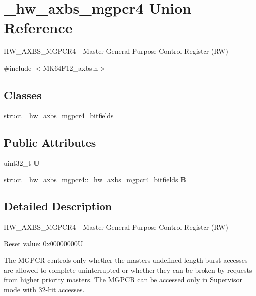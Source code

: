 \hypertarget{union__hw__axbs__mgpcr4}{}\section{\+\_\+hw\+\_\+axbs\+\_\+mgpcr4 Union Reference}
\label{union__hw__axbs__mgpcr4}


H\+W\+\_\+\+A\+X\+B\+S\+\_\+\+M\+G\+P\+C\+R4 -\/ Master General Purpose Control Register (RW)  




{\ttfamily \#include $<$M\+K64\+F12\+\_\+axbs.\+h$>$}

\subsection*{Classes}
\begin{DoxyCompactItemize}
\item 
struct \hyperlink{struct__hw__axbs__mgpcr4_1_1__hw__axbs__mgpcr4__bitfields}{\+\_\+hw\+\_\+axbs\+\_\+mgpcr4\+\_\+bitfields}
\end{DoxyCompactItemize}
\subsection*{Public Attributes}
\begin{DoxyCompactItemize}
\item 
uint32\+\_\+t {\bfseries U}\hypertarget{union__hw__axbs__mgpcr4_a91cc8c8ae195b426b1f2929d1d1484ff}{}\label{union__hw__axbs__mgpcr4_a91cc8c8ae195b426b1f2929d1d1484ff}

\item 
struct \hyperlink{struct__hw__axbs__mgpcr4_1_1__hw__axbs__mgpcr4__bitfields}{\+\_\+hw\+\_\+axbs\+\_\+mgpcr4\+::\+\_\+hw\+\_\+axbs\+\_\+mgpcr4\+\_\+bitfields} {\bfseries B}\hypertarget{union__hw__axbs__mgpcr4_a7a9ec318d3622d5f4a5410ba60999d7e}{}\label{union__hw__axbs__mgpcr4_a7a9ec318d3622d5f4a5410ba60999d7e}

\end{DoxyCompactItemize}


\subsection{Detailed Description}
H\+W\+\_\+\+A\+X\+B\+S\+\_\+\+M\+G\+P\+C\+R4 -\/ Master General Purpose Control Register (RW) 

Reset value\+: 0x00000000U

The M\+G\+P\+CR controls only whether the master\textquotesingle{}s undefined length burst accesses are allowed to complete uninterrupted or whether they can be broken by requests from higher priority masters. The M\+G\+P\+CR can be accessed only in Supervisor mode with 32-\/bit accesses. 

